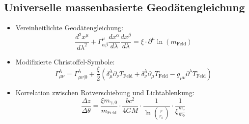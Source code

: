 \documentclass[12pt,a4paper]{article}
\begin{document}
\subsection{Universelle massenbasierte Geodätengleichung}
\begin{itemize}
	\item Vereinheitlichte Geodätengleichung:
	\begin{equation}
		\boxed{\frac{d^2 x^\mu}{d\lambda^2} + \Gamma^\mu_{\alpha\beta}\frac{dx^\alpha}{d\lambda}\frac{dx^\beta}{d\lambda} = \xi \cdot \partial^\mu \ln(m_{\text{Feld}})}
	\end{equation}
	
	\item Modifizierte Christoffel-Symbole:
	\begin{equation}
		\Gamma^\lambda_{\mu\nu} = \Gamma^\lambda_{\mu\nu|0} + \frac{\xi}{2} \left(\delta^\lambda_\mu \partial_\nu T_{\text{Feld}} + \delta^\lambda_\nu \partial_\mu T_{\text{Feld}} - g_{\mu\nu} \partial^\lambda T_{\text{Feld}}\right)
	\end{equation}
	
	\item Korrelation zwischen Rotverschiebung und Lichtablenkung:
	\begin{equation}
		\frac{\Delta z}{\Delta \theta} = \frac{\xi m_{\gamma,0}}{m_{\text{Feld}}} \cdot \frac{bc^2}{4GM} \cdot \frac{1}{\ln\left(\frac{r}{r_0}\right)} \cdot \frac{1}{\xi \frac{m_\gamma}{m_0}}
	\end{equation}
\end{itemize}
\end{document}

